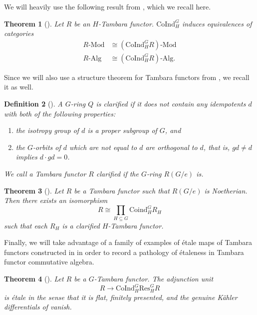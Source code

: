 \documentclass[11pt,dvipsnames]{amsart}
\newtheorem{theorem}{Theorem}[section]
\theoremstyle{BoldRemark}
\newtheorem{definition}[theorem]{Definition}
\newcommand{\Res}{\mathrm{Res}}
\newcommand{\Coind}{\mathrm{CoInd}}
\renewcommand{\subset}{\subseteq}
\newcommand{\Mod}{\mathrm{Mod}}
\begin{document}
We will heavily use the following result from \cite{Wis25a}, which we recall here. 

\begin{theorem}[{\cite[Theorem F and Corollary G]{Wis25a}}]
    Let $R$ be an $H$-Tambara functor. $\Coind_H^G$ induces equivalences of categories
    \begin{align*}
        R \text{-} \Mod & \cong ( \Coind_H^G R ) \text{-} \Mod \\
        R \text{-} \mathrm{Alg} & \cong ( \Coind_H^G R ) \text{-} \mathrm{Alg} .
    \end{align*} 
\end{theorem}

Since we will also use a structure theorem for Tambara functors from \cite{Wis25a}, we recall it as well.

\begin{definition}[{\cite[Definition C]{Wis25a}}]\label{def:clarified}
	A $G$-ring $Q$ is \emph{clarified} if it does not contain any idempotents $d$ with both of the following properties: 
	\begin{enumerate}
		\item the isotropy group of $d$ is a proper subgroup of $G$, and
		\item the $G$-orbits of $d$ which are not equal to $d$ are orthogonal to $d$, that is, $gd \neq d$ implies $d \cdot gd = 0$.
	\end{enumerate}
    We call a Tambara functor $R$ clarified if the $G$-ring $R(G/e)$ is.
\end{definition}

\begin{theorem}[{\cite[Theorem D]{Wis25a}}]
	Let $R$ be a Tambara functor such that $R(G/e)$ is Noetherian. Then there exists an isomorphism 
    \[ 
        R \cong \prod_{H \subset G} \mathrm{Coind}_H^G R_H 
    \] 
    such that each $R_H$ is a clarified $H$-Tambara functor.
\end{theorem}

Finally, we will take advantage of a family of examples of \'{e}tale maps of Tambara functors constructed in \cite{Wis25c} in order to record a pathology of \'{e}taleness in Tambara functor commutative algebra.

\begin{theorem}[{\cite[Theorem A]{Wis25c}}]
    Let $R$ be a $G$-Tambara functor. The adjunction unit 
    \[ 
        R \rightarrow \Coind_H^G \Res_H^G R 
    \] 
    is \'{e}tale in the sense that it is flat, finitely presented, and the genuine K\"{a}hler differentials of \cite[Definition 4.1]{Hil17} vanish.
\end{theorem}
\end{document}
